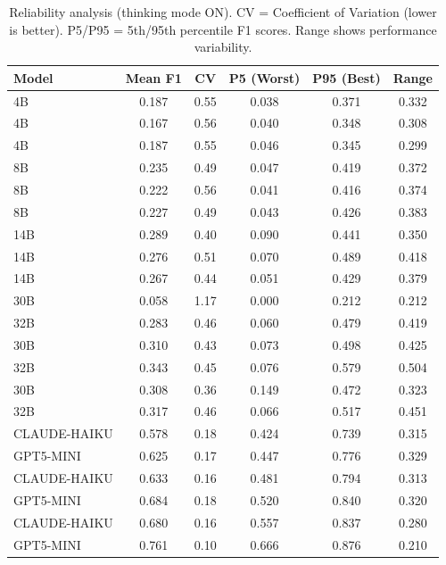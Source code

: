 \begin{table}[t]
\centering
\small
\caption{Reliability analysis (thinking mode ON). CV = Coefficient of Variation (lower is better). P5/P95 = 5th/95th percentile F1 scores. Range shows performance variability.}
\label{tab:reliability_analysis}
\begin{tabular}{lccccc}
\toprule
\textbf{Model} & \textbf{Mean F1} & \textbf{CV} & \textbf{P5 (Worst)} & \textbf{P95 (Best)} & \textbf{Range} \\
\midrule
4B  & 0.187 & 0.55 & 0.038 & 0.371 & 0.332 \\
4B  & 0.167 & 0.56 & 0.040 & 0.348 & 0.308 \\
4B  & 0.187 & 0.55 & 0.046 & 0.345 & 0.299 \\
8B  & 0.235 & 0.49 & 0.047 & 0.419 & 0.372 \\
8B  & 0.222 & 0.56 & 0.041 & 0.416 & 0.374 \\
8B  & 0.227 & 0.49 & 0.043 & 0.426 & 0.383 \\
14B & 0.289 & 0.40 & 0.090 & 0.441 & 0.350 \\
14B & 0.276 & 0.51 & 0.070 & 0.489 & 0.418 \\
14B & 0.267 & 0.44 & 0.051 & 0.429 & 0.379 \\
30B & 0.058 & 1.17 & 0.000 & 0.212 & 0.212 \\
32B & 0.283 & 0.46 & 0.060 & 0.479 & 0.419 \\
30B & 0.310 & 0.43 & 0.073 & 0.498 & 0.425 \\
32B & 0.343 & 0.45 & 0.076 & 0.579 & 0.504 \\
30B & 0.308 & 0.36 & 0.149 & 0.472 & 0.323 \\
32B & 0.317 & 0.46 & 0.066 & 0.517 & 0.451 \\
CLAUDE-HAIKU & 0.578 & 0.18 & 0.424 & 0.739 & 0.315 \\
GPT5-MINI & 0.625 & 0.17 & 0.447 & 0.776 & 0.329 \\
CLAUDE-HAIKU & 0.633 & 0.16 & 0.481 & 0.794 & 0.313 \\
GPT5-MINI & 0.684 & 0.18 & 0.520 & 0.840 & 0.320 \\
CLAUDE-HAIKU & 0.680 & 0.16 & 0.557 & 0.837 & 0.280 \\
GPT5-MINI & 0.761 & 0.10 & 0.666 & 0.876 & 0.210 \\
\bottomrule
\end{tabular}
\end{table}




